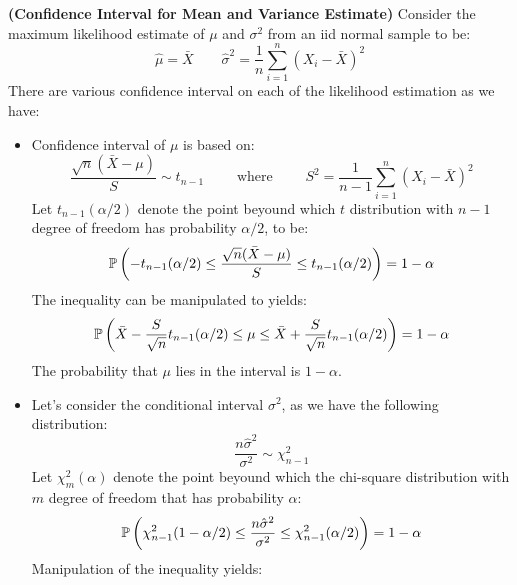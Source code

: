 \begin{remark}{\textbf{(Confidence Interval for Mean and Variance Estimate)}}
    Consider the maximum likelihood estimate of $\mu$ and $\sigma^2$ from an iid normal sample to be:
    \begin{equation*}
        \hat{\mu} = \bar{X} \qquad \hat{\sigma}^2 = \frac{1}{n}\sum^n_{i=1}(X_i - \bar{X})^2
    \end{equation*}
    There are various confidence interval on each of the likelihood estimation as we have:
    \begin{itemize}
        \item Confidence interval of $\mu$ is based on:
        \begin{equation*}
            \frac{\sqrt{n}(\bar{X} - \mu)}{S} \sim t_{n-1} \qquad \text{ where } \qquad S^2 = \frac{1}{n-1}\sum^n_{i=1}(X_i-\bar{X})^2
        \end{equation*}
        Let $t_{n-1}(\alpha/2)$ denote the point beyound which $t$ distribution with $n-1$ degree of freedom has probability $\alpha/2$, to be:
        \begin{equation*}
            \mathbb{P}\left( -t_{n-1}(\alpha/2)\le \frac{\sqrt{n}(\bar{X} - \mu)}{S} \le t_{n-1}(\alpha/2) \right) = 1-\alpha
        \end{equation*}
        The inequality can be manipulated to yields:
        \begin{equation*}
            \mathbb{P}\left( \bar{X} - \frac{S}{\sqrt{n}} t_{n-1}(\alpha/2) \le \mu \le \bar{X} + \frac{S}{\sqrt{n}}t_{n-1}(\alpha/2)  \right) = 1-\alpha
        \end{equation*}
        The probability that $\mu$ lies in the interval is $1-\alpha$. 
        \item Let's consider the conditional interval $\sigma^2$, as we have the following distribution:
        \begin{equation*}
            \frac{n\hat{\sigma}^2}{\sigma^2} \sim \chi^2_{n-1}
        \end{equation*}
        Let $\chi^2_m(\alpha)$ denote the point beyound which the chi-square distribution with $m$ degree of freedom that has probability $\alpha$:
        \begin{equation*}
            \mathbb{P}\left( \chi^2_{n-1}(1-\alpha/2)\le \frac{n\hat{\sigma}^2}{\sigma^2} \le \chi^2_{n-1}(\alpha/2) \right) = 1-\alpha
        \end{equation*}
        Manipulation of the inequality yields:
        \begin{equation*}

\end{equation*}
\end{itemize}
\end{remark}
